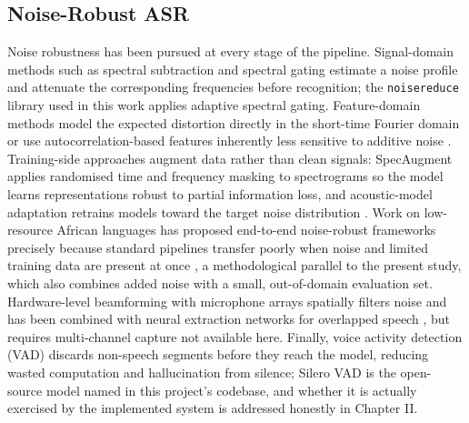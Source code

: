 \documentclass[12pt]{report}
\begin{document}
\subsection{Noise-Robust ASR}
Noise robustness has been pursued at every stage of the pipeline. Signal-domain methods such as spectral subtraction and spectral gating estimate a noise profile and attenuate the corresponding frequencies before recognition; the \texttt{noisereduce} library used in this work applies adaptive spectral gating. Feature-domain methods model the expected distortion directly in the short-time Fourier domain \cite{astudillo2013computing} or use autocorrelation-based features inherently less sensitive to additive noise \cite{farahani2017autocorrelation}. Training-side approaches augment data rather than clean signals: SpecAugment \cite{park2019specaugment} applies randomised time and frequency masking to spectrograms so the model learns representations robust to partial information loss, and acoustic-model adaptation retrains models toward the target noise distribution \cite{li2014overview,bhardwaj2021usage}. Work on low-resource African languages has proposed end-to-end noise-robust frameworks precisely because standard pipelines transfer poorly when noise and limited training data are present at once \cite{ejigu2025noise}, a methodological parallel to the present study, which also combines added noise with a small, out-of-domain evaluation set. Hardware-level beamforming with microphone arrays spatially filters noise and has been combined with neural extraction networks for overlapped speech \cite{chen2018multi}, but requires multi-channel capture not available here. Finally, voice activity detection (VAD) discards non-speech segments before they reach the model, reducing wasted computation and hallucination from silence; Silero VAD is the open-source model named in this project's codebase, and whether it is actually exercised by the implemented system is addressed honestly in Chapter II.
\end{document}
